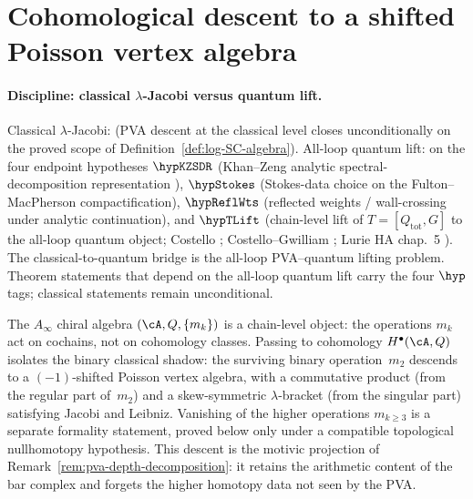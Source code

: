 
\section{Cohomological descent to a shifted Poisson vertex algebra}
\label{sec:PVA_descent}
\label{sec:Ainfty-to-PVA}

\paragraph{Discipline: classical $\lambda$-Jacobi versus quantum lift.}
Classical $\lambda$-Jacobi: \ClaimStatusProvedHere{} (PVA descent at the
classical level closes unconditionally on the proved scope of
Definition~\ref{def:log-SC-algebra}). All-loop quantum lift:
\ClaimStatusConditional{} on the four endpoint hypotheses
$\hypKZSDR$ (Khan--Zeng analytic spectral-decomposition representation
\cite{KZ25}), $\hypStokes$ (Stokes-data choice on the Fulton--MacPherson
compactification), $\hypReflWts$ (reflected weights / wall-crossing
under analytic continuation), and $\hypTLift$ (chain-level lift of
$T = [Q_{\mathrm{tot}}, G]$ to the all-loop quantum object;
Costello \cite{Costello2011Renorm}; Costello--Gwilliam \cite{CG17};
Lurie HA chap.~5 \cite{LurieHA}). The classical-to-quantum bridge is
the all-loop PVA--quantum lifting problem. Theorem statements that depend
on the all-loop quantum lift carry the four $\hyp$ tags; classical
statements remain unconditional.

The $A_\infty$ chiral algebra $(\cA, Q, \{m_k\})$ is a chain-level
object: the operations $m_k$ act on cochains, not on cohomology
classes. Passing to cohomology $H^\bullet(\cA, Q)$ isolates the
binary classical shadow: the surviving binary operation~$m_2$
descends to a $(-1)$-shifted Poisson vertex algebra, with a
commutative product (from the regular part of~$m_2$) and a
skew-symmetric $\lambda$-bracket (from the singular part)
satisfying Jacobi and Leibniz. Vanishing of the higher operations
$m_{k\ge3}$ is a separate formality statement, proved below only
under a compatible topological nullhomotopy hypothesis. This
descent is the motivic projection of
Remark~\ref{rem:pva-depth-decomposition}: it retains the arithmetic
content of the bar complex and forgets the higher homotopy data not
seen by the PVA.

